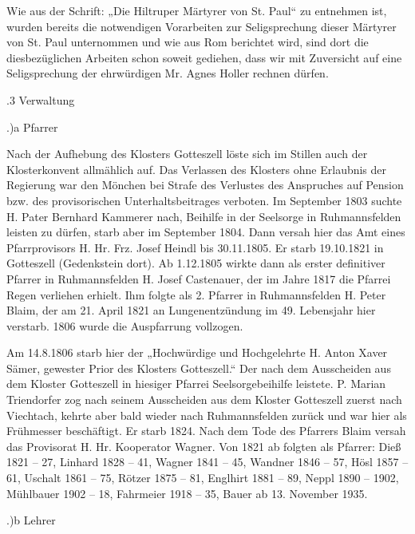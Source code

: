 Wie aus der Schrift: „Die Hiltruper Märtyrer von St. Paul“ zu entnehmen ist,
wurden bereits die notwendigen Vorarbeiten zur Seligsprechung dieser Märtyrer
von St. Paul unternommen und wie aus Rom berichtet wird, sind dort die
diesbezüglichen Arbeiten schon soweit gediehen, dass wir mit Zuversicht auf eine
Seligsprechung der ehrwürdigen Mr. Agnes Holler rechnen dürfen.

.3 Verwaltung

.)a Pfarrer

Nach der Aufhebung des Klosters Gotteszell löste sich im Stillen auch der
Klosterkonvent allmählich auf. Das Verlassen des Klosters ohne Erlaubnis der
Regierung war den Mönchen bei Strafe des Verlustes des Anspruches auf Pension
bzw. des provisorischen Unterhaltsbeitrages verboten. Im September 1803 suchte
H. Pater Bernhard Kammerer nach, Beihilfe in der Seelsorge in Ruhmannsfelden
leisten zu dürfen, starb aber im September 1804. Dann versah hier das Amt eines
Pfarrprovisors H. Hr. Frz. Josef Heindl bis 30.11.1805. Er starb 19.10.1821 in
Gotteszell (Gedenkstein dort). Ab 1.12.1805 wirkte dann als erster definitiver
Pfarrer in Ruhmannsfelden H. Josef Castenauer, der im Jahre 1817 die Pfarrei
Regen verliehen erhielt. Ihm folgte als 2. Pfarrer in Ruhmannsfelden H. Peter
Blaim, der am 21. April 1821 an Lungenentzündung im 49. Lebensjahr hier
verstarb. 1806 wurde die Auspfarrung vollzogen.

Am 14.8.1806 starb hier der „Hochwürdige und Hochgelehrte H. Anton Xaver Sämer,
gewester Prior des Klosters Gotteszell.“ Der nach dem Ausscheiden aus dem
Kloster Gotteszell in hiesiger Pfarrei Seelsorgebeihilfe leistete. P. Marian
Triendorfer zog nach seinem Ausscheiden aus dem Kloster Gotteszell zuerst nach
Viechtach, kehrte aber bald wieder nach Ruhmannsfelden zurück und war hier als
Frühmesser beschäftigt. Er starb 1824. Nach dem Tode des Pfarrers Blaim versah
das Provisorat H. Hr. Kooperator Wagner. Von 1821 ab folgten als Pfarrer: Dieß
1821 – 27, Linhard 1828 – 41, Wagner 1841 – 45, Wandner 1846 – 57, Hösl 1857 –
61, Uschalt 1861 – 75, Rötzer 1875 – 81, Englhirt 1881 – 89, Neppl 1890 – 1902,
Mühlbauer 1902 – 18, Fahrmeier 1918 – 35, Bauer ab 13. November 1935.

.)b Lehrer

